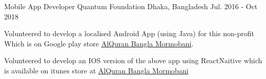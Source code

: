

\begin{cventries}

  \cventry
    {Mobile App Developer} %
    {Quantum Foundation} %
    {Dhaka, Bangladesh} %
    {Jul. 2016 - Oct 2018} %
    {
      \begin{cvitems} %
        \item {Volunteered to develop a localised Android App (using Java) for this non-profit Which is on Google play store \href{https://play.google.com/store/apps/details?id=quantum.org.quran}{\color{blue}AlQuran Bangla Mormobani}.}
        \item {Volunteered to develop an IOS version of the above app using ReactNaitive which is available on itunes store at \href{https://itunes.apple.com/us/app/al-quran-bangla-mormobani/id1229434136?mt=8}{\color{blue}AlQuran Bangla Mormobani}}
      \end{cvitems}
    }

\end{cventries}

